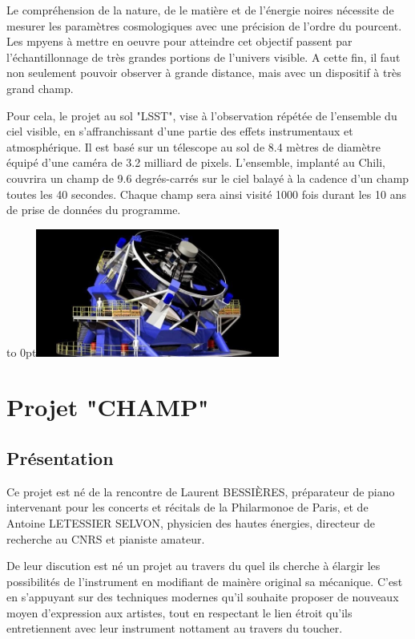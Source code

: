 \documentclass[french,a4paper,12pt]{report}
\begin{document}
\begin{itemize}
  Le compréhension de la nature, de le matière et de l'énergie noires nécessite de mesurer les paramètres cosmologiques avec une précision de l'ordre du pourcent. Les mpyens à mettre en oeuvre pour atteindre cet objectif passent par l'échantillonnage de très grandes portions de l'univers visible. A cette fin, il faut non seulement pouvoir observer à grande distance, mais avec un dispositif à très grand champ.
  
  Pour cela, le projet au sol "LSST", vise à l'observation répétée de l'ensemble du ciel visible, en s'affranchissant d'une partie des effets instrumentaux et atmosphérique. Il est basé sur un télescope au sol de 8.4 mètres de diamètre équipé d'une caméra de 3.2 milliard de pixels. L'ensemble, implanté au Chili, couvrira un champ de 9.6 degrés-carrés sur le ciel balayé à la cadence d'un champ toutes les 40 secondes. Chaque champ sera ainsi visité 1000 fois durant les 10 ans de prise de données du programme.\newline
    	
  	\hfill\hbox to 0pt{\hss\includegraphics[width=8cm]{lsst.jpg}\hss}\hfill\null
  \end{itemize}
  
    
%
%
\part{Projet "CHAMP"}
  \chapter{Présentation}
  
  Ce projet est né de la rencontre de Laurent BESSIÈRES, préparateur de piano intervenant pour les concerts et récitals de la Philarmonoe de Paris, et de Antoine LETESSIER SELVON, physicien des hautes énergies, directeur de recherche au CNRS et pianiste amateur. 
  
  De leur discution est né un projet au travers du quel ils cherche à élargir les possibilités de l'instrument en modifiant de mainère original sa mécanique. C'est en s'appuyant sur des techniques modernes qu'il souhaite proposer de nouveaux moyen d'expression aux artistes, tout en respectant le lien étroit qu'ils entretiennent avec leur instrument nottament au travers du toucher.
  
\end{document}
